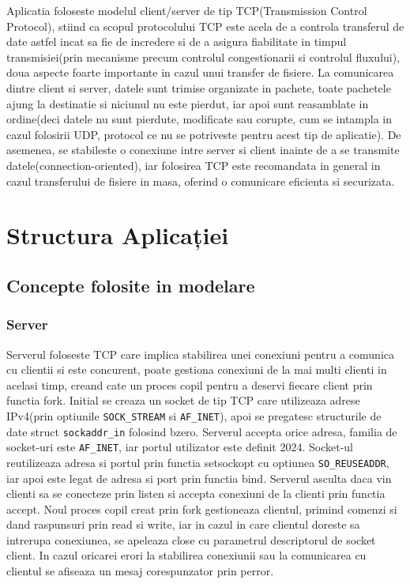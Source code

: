 \documentclass[runningheads]{llncs}
\begin{document}
Aplicatia foloseste modelul client/server de tip TCP(Transmission Control Protocol), stiind ca scopul protocolului TCP este acela de a controla transferul de date astfel incat sa fie de incredere si de a asigura fiabilitate in timpul transmisiei(prin mecanisme precum controlul congestionarii si controlul fluxului), doua aspecte foarte importante in cazul unui transfer de fisiere. La comunicarea dintre client si server, datele sunt trimise organizate in pachete, toate pachetele ajung la destinatie si niciunul nu este pierdut, iar apoi sunt reasamblate in ordine(deci datele nu sunt pierdute, modificate sau corupte, cum se intampla in cazul folosirii UDP, protocol ce nu se potriveste pentru acest tip de aplicatie). De asemenea, se stabileste o conexiune intre server si client inainte de a se transmite datele(connection-oriented), iar folosirea TCP este recomandata in general in cazul transferului de fisiere in masa, oferind o comunicare eficienta si securizata.

\section{Structura Aplicației}

\subsection{Concepte folosite in modelare}

\subsubsection{Server} 

Serverul foloseste TCP care implica stabilirea unei conexiuni pentru a comunica cu clientii si este concurent, poate gestiona conexiuni de la mai multi clienti in acelasi timp, creand cate un proces copil pentru a deservi fiecare client prin functia fork. Initial se creaza un socket de tip TCP care utilizeaza adrese IPv4(prin optiunile \texttt{SOCK\_STREAM} si \texttt{AF\_INET}), apoi se pregatesc structurile de date struct \texttt{sockaddr\_in} folosind bzero. Serverul accepta orice adresa, familia de socket-uri este \texttt{AF\_INET}, iar portul utilizator este definit 2024. Socket-ul reutilizeaza adresa si portul prin functia setsockopt cu optiunea \texttt{SO\_REUSEADDR}, iar apoi este legat de adresa si port prin functia bind. Serverul asculta daca vin clienti sa se conecteze prin listen si accepta conexiuni de la clienti prin functia accept. Noul proces copil creat prin fork gestioneaza clientul, primind comenzi si dand raspunsuri prin read si write, iar in cazul in care clientul doreste sa intrerupa conexiunea, se apeleaza close cu parametrul descriptorul de socket client. In cazul oricarei erori la stabilirea conexiunii sau la comunicarea cu clientul se afiseaza un mesaj corespunzator prin perror.
\end{document}

